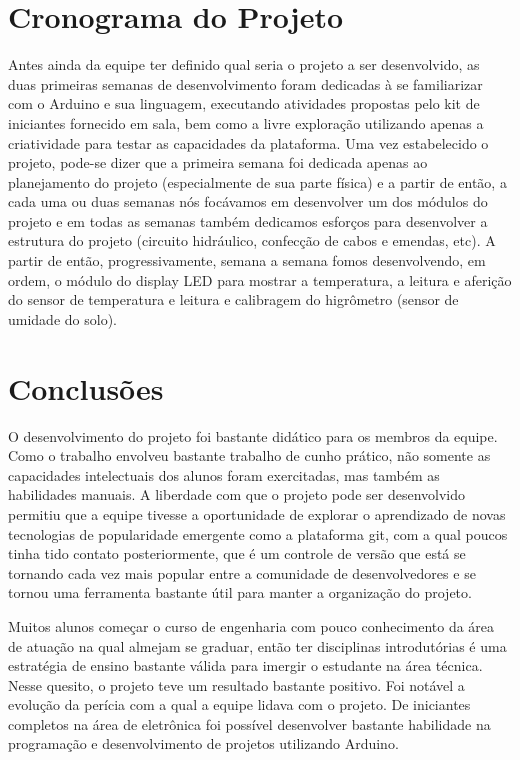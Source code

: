 \documentclass[a4paper,12pt]{article}
\begin{document}
\section{Cronograma do Projeto}
Antes ainda da equipe ter definido qual seria o projeto a ser desenvolvido, as duas primeiras semanas de desenvolvimento foram dedicadas à se familiarizar com o Arduino e sua linguagem, executando atividades propostas pelo kit de iniciantes fornecido em sala, bem como a livre exploração utilizando apenas a criatividade para testar as capacidades da plataforma. Uma vez estabelecido o projeto, pode-se dizer que a primeira semana foi dedicada apenas ao planejamento do projeto (especialmente de sua parte física) e a partir de então, a cada uma ou duas semanas nós focávamos em desenvolver um dos módulos do projeto e em todas as semanas também dedicamos esforços para desenvolver a estrutura do projeto (circuito hidráulico, confecção de cabos e emendas, etc). A partir de então, progressivamente, semana a semana fomos desenvolvendo, em ordem, o módulo do display LED para mostrar a temperatura, a leitura e aferição do sensor de temperatura e leitura e calibragem do higrômetro (sensor de umidade do solo).


\section{Conclusões}
O desenvolvimento do projeto foi bastante didático para os membros da equipe. Como o trabalho envolveu bastante trabalho de cunho prático, não somente as capacidades intelectuais dos alunos foram exercitadas, mas também as habilidades manuais. A liberdade com que o projeto pode ser desenvolvido permitiu que a equipe tivesse a oportunidade de explorar o aprendizado de novas tecnologias de popularidade emergente como a plataforma git, com a qual poucos tinha tido contato posteriormente, que é um controle de versão que está se tornando cada vez mais popular entre a comunidade de desenvolvedores e se tornou uma ferramenta bastante útil para manter a organização do projeto.

Muitos alunos começar o curso de engenharia com pouco conhecimento da área de atuação na qual almejam se graduar, então ter disciplinas introdutórias é uma estratégia de ensino bastante válida para imergir o estudante na área técnica. Nesse quesito, o projeto teve um resultado bastante positivo. Foi notável a evolução da perícia com a qual a equipe lidava com o projeto. De iniciantes completos na área de eletrônica foi possível desenvolver bastante habilidade na programação e desenvolvimento de projetos utilizando Arduino.
\end{document}
